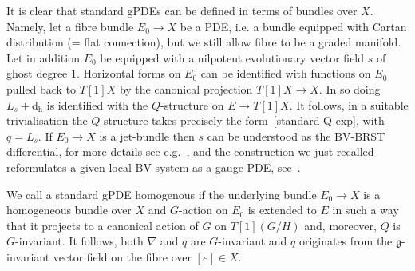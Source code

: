 \documentclass[a4paper,12pt]{article}
\numberwithin{equation}{section} %
\renewcommand{\dh}{\mathrm{d_h}}
\newcommand{\Liealg}{\mathfrak}
\newcommand{\algg}{\Liealg{g}}
\begin{document}
It is clear that standard gPDEs can be defined in terms of bundles over $X$. Namely, let a fibre bundle $E_0\to X$ be a PDE, i.e. a bundle equipped with Cartan distribution (= flat connection), but we still allow fibre to be a graded manifold. Let in addition $E_0$ be equipped with a nilpotent  evolutionary vector field $s$  of ghost degree $1$. Horizontal forms on $E_0$ can be identified with functions on $E_0$ pulled back to $T[1]X$ by the canonical projection $T[1]X\to X$. In so doing $L_s+\dh$ is identified with the $Q$-structure on $E \to T[1]X$. It follows, in a suitable trivialisation the $Q$ structure takes precisely the form~\eqref{standard-Q-exp}, with $q=L_s$. If $E_0 \to X$ is a jet-bundle then $s$ can be understood as the BV-BRST differential, for more details see e.g.~\cite{Barnich:2000zw},  and the construction we just recalled reformulates a given local BV system as a gauge PDE, see~\cite{Barnich:2010sw,Grigoriev:2019ojp, Grigoriev:2022zlq}.  

We call a standard gPDE homogenous if the underlying bundle $E_0 \to X$ is a homogeneous bundle over $X$ and $G$-action on $E_0$ is extended to $E$ in such a way that it projects to a canonical action of $G$ on $T[1](G/H)$ and, moreover, $Q$ is $G$-invariant. It follows, both $\nabla$ and $q$ are $G$-invariant and $q$ originates from the $\algg$-invariant vector field on the fibre over $[e]\in X$.
\end{document}
